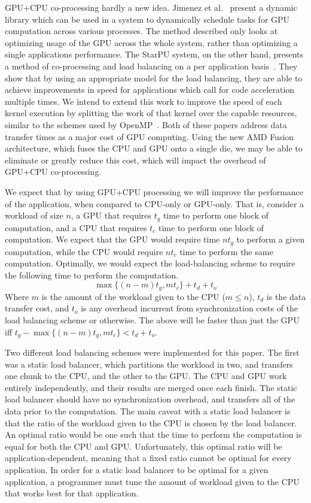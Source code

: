 \documentclass[journal]{IEEEtran}
\begin{document}
GPU+CPU co-processing hardly a new idea.  Jimenez et al.~\cite{Jimenez2009} present a
dynamic library which can be used in a system to dynamically schedule tasks for GPU
computation across various processes. The method described only looks at optimizing
usage of the GPU across the whole system, rather than optimizing a single applications
performance. The StarPU system, on the other hand, presents a method of co-processing
and load balancing on a per application basis~\cite{Augonnet2009}. They show that by
using an appropriate model for the load balancing, they are able to achieve improvements
in speed for applications which call for code acceleration multiple times.  We intend
to extend this work to improve the speed of each kernel execution by splitting the
work of that kernel over the capable resources, similar to the schemes used by
OpenMP~\cite{Dagum1998}. Both of these papers address data transfer times as a major cost
of GPU computing. Using the new AMD Fusion architecture, which fuses the CPU and GPU onto
a single die, we may be able to eliminate or greatly reduce this cost, which will impact
the overhead of GPU+CPU co-processing.

We expect that by using GPU+CPU processing we will improve the performance of the
application, when compared to CPU-only or GPU-only.  That is, consider a workload of size
$n$, a GPU that requires $t_g$ time to perform one block of computation, and a CPU that
requires $t_c$ time to perform one block of computation. We expect that the GPU would
require time $nt_g$ to perform a given computation, while the CPU would require $nt_c$
time to perform the same computation.  Optimally, we would expect the load-balancing
scheme to require the following time to perform the computation.
\[\max{\{(n-m)t_g, mt_c}\} + t_d + t_o\]
Where $m$ is the amount of the workload given to the CPU ($m \leq n$), $t_d$ is the data
transfer cost, and $t_o$ is any overhead incurrent from synchronization costs of the load
balancing scheme or otherwise.  The above will be faster than just the GPU iff
$t_g - \max{\{(n-m)t_g, mt_c}\} < t_d + t_o$.

Two different load balancing schemes were implemented for this paper.  The first was a
static load balancer, which partitions the workload in two, and transfers one chunk to
the CPU, and the other to the GPU.  The CPU and GPU work entirely independently, and
their results are merged once each finish.  The static load balancer should have no
synchronization overhead, and transfers all of the data prior to the computation.
The main caveat with a static load balancer is that the ratio of the workload given to
the CPU is chosen by the load balancer.  An optimal ratio would be one such that the
time to perform the computation is equal for both the CPU and GPU.  Unfortunately, this
optimal ratio will be application-dependent, meaning that a fixed ratio cannot be optimal
for every application.  In order for a static load balancer to be optimal for a given
application, a programmer must tune the amount of workload given to the CPU that works
best for that application.
\end{document}
